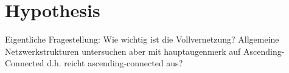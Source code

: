 \documentclass[Bachelorarbeit.tex]{subfiles}
\begin{document}
\chapter{Hypothesis}
Eigentliche Fragestellung: Wie wichtig ist die Vollvernetzung?
	Allgemeine Netzwerkstrukturen untersuchen aber mit hauptaugenmerk auf Ascending-Connected d.h. reicht ascending-connected aus?
\end{document}
